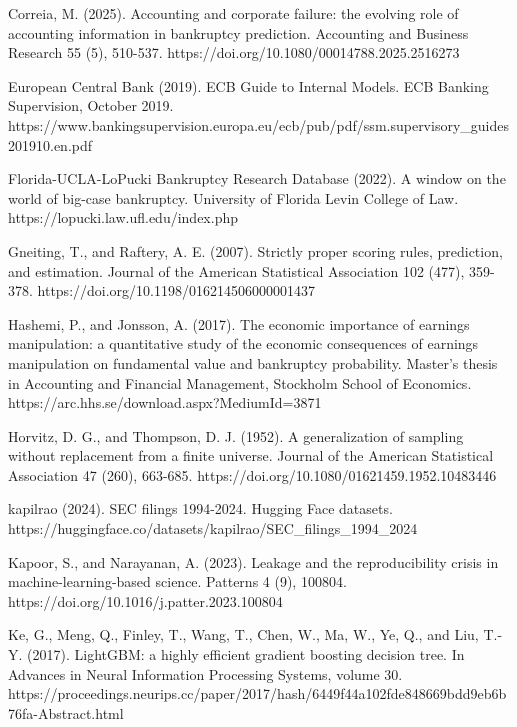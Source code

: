 \documentclass[10pt,a4paper,twocolumn]{article}
\begin{document}
\noindent Correia, M. (2025). Accounting and corporate failure: the evolving role of accounting information in bankruptcy prediction. Accounting and Business Research 55 (5), 510-537. https://doi.org/10.1080/00014788.2025.2516273\par\vspace{2pt}
\noindent European Central Bank (2019). ECB Guide to Internal Models. ECB Banking Supervision, October 2019. https://www.bankingsupervision.europa.eu/ecb/pub/pdf/ssm.supervisory\_guides201910.en.pdf\par\vspace{2pt}
\noindent Florida-UCLA-LoPucki Bankruptcy Research Database (2022). A window on the world of big-case bankruptcy. University of Florida Levin College of Law. https://lopucki.law.ufl.edu/index.php\par\vspace{2pt}
\noindent Gneiting, T., and Raftery, A. E. (2007). Strictly proper scoring rules, prediction, and estimation. Journal of the American Statistical Association 102 (477), 359-378. https://doi.org/10.1198/016214506000001437\par\vspace{2pt}
\noindent Hashemi, P., and Jonsson, A. (2017). The economic importance of earnings manipulation: a quantitative study of the economic consequences of earnings manipulation on fundamental value and bankruptcy probability. Master’s thesis in Accounting and Financial Management, Stockholm School of Economics. https://arc.hhs.se/download.aspx?MediumId=3871\par\vspace{2pt}
\noindent Horvitz, D. G., and Thompson, D. J. (1952). A generalization of sampling without replacement from a finite universe. Journal of the American Statistical Association 47 (260), 663-685. https://doi.org/10.1080/01621459.1952.10483446\par\vspace{2pt}
\noindent kapilrao (2024). SEC filings 1994-2024. Hugging Face datasets. https://huggingface.co/datasets/kapilrao/SEC\_filings\_1994\_2024\par\vspace{2pt}
\noindent Kapoor, S., and Narayanan, A. (2023). Leakage and the reproducibility crisis in machine-learning-based science. Patterns 4 (9), 100804. https://doi.org/10.1016/j.patter.2023.100804\par\vspace{2pt}
\noindent Ke, G., Meng, Q., Finley, T., Wang, T., Chen, W., Ma, W., Ye, Q., and Liu, T.-Y. (2017). LightGBM: a highly efficient gradient boosting decision tree. In Advances in Neural Information Processing Systems, volume 30. https://proceedings.neurips.cc/paper/2017/hash/6449f44a102fde848669bdd9eb6b76fa-Abstract.html\par\vspace{2pt}
\end{document}
